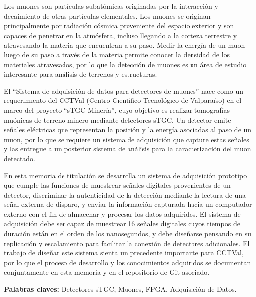 Los muones son partículas subatómicas originadas por la interacción y decaimiento de otras partículas elementales. Los muones se originan principalmente por radiación cósmica proveniente del espacio exterior y son capaces de penetrar en la atmósfera, incluso llegando a la corteza terrestre y atravesando la materia que encuentran a su paso. Medir la energía de un muon luego de su paso a través de la materia permite conocer la densidad de los materiales atravesados, por lo que la detección de muones es un área de estudio interesante para análisis de terrenos y estructuras.

El ``Sistema de adquisición de datos para detectores de muones'' nace como un requerimiento del CCTVal (Centro Científico Tecnológico de Valparaíso) en  el marco del proyecto ``sTGC Minería'', cuyo objetivo es realizar tomografías muónicas de terreno minero mediante detectores sTGC. Un detector emite señales eléctricas que representan la posición y la energía asociadas al paso de un muon, por lo que se requiere un sistema de adquisición que capture estas señales y las entregue a un posterior sistema de análisis para la caracterización del muon detectado.

En esta memoria de titulación se desarrolla un sistema de adquisición prototipo que cumple las funciones de muestrear señales digitales provenientes de un detector, discriminar la autenticidad de la detección mediante la lectura de una señal externa de disparo, y enviar la información capturada hacia un computador externo con el fin de almacenar y procesar los datos adquiridos. El sistema de adquisición debe ser capaz de muestrear 16 señales digitales cuyos tiempos de duración están en el orden de los nanosegundos, y debe diseñarse pensando en su replicación y escalamiento para facilitar la conexión de detectores adicionales. El trabajo de diseñar este sistema sienta un precedente importante para CCTVal, por lo que el proceso de desarrollo y los conocimientos adquiridos se documentan conjuntamente en esta memoria y en el repositorio de Git asociado.

\textbf{Palabras claves:} Detectores sTGC,  Muones, FPGA, Adquisición de Datos.